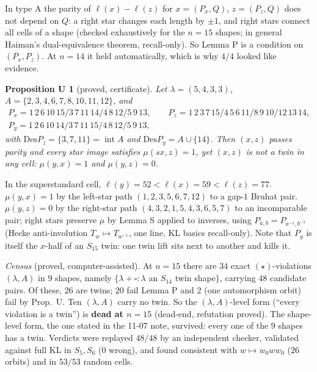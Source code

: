 \documentclass[11pt]{amsart}
\newcommand{\gr}[1]{\textsf{#1}}
\newtheorem*{propU}{Proposition U}
\theoremstyle{definition}
\theoremstyle{remark}
\newcommand{\Des}{\mathrm{Des}}
\newcommand{\intr}{\operatorname{int}}
\begin{document}
In type A the parity of $\ell(x)-\ell(z)$ for $x=(P_x,Q)$, $z=(P_z,Q)$ does not depend on $Q$: a right star changes each length by $\pm1$, and right stars connect all cells of a shape (checked exhaustively for the $n=15$ shapes; in general Haiman's dual-equivalence theorem, recall-only). So Lemma P is a condition on $(P_x,P_z)$. At $n=14$ it held automatically, which is why $4/4$ looked like evidence.

\begin{propU}[\gr{proved}, certificate]
Let $\lambda=(5,4,3,3)$, $A=\{2,3,4,6,7,8,10,11,12\}$, and
\begin{gather*}P_x=1\,2\,6\,10\,15/3\,7\,11\,14/4\,8\,12/5\,9\,13,\qquad P_z=1\,2\,3\,7\,15/4\,5\,6\,11/8\,9\,10/12\,13\,14,\\ P_y=1\,2\,6\,10\,14/3\,7\,11\,15/4\,8\,12/5\,9\,13,\end{gather*}
with $\Des P_z=\{3,7,11\}=\intr A$ and $\Des P_y=A\cup\{14\}$. Then $(x,z)$ passes parity and every star image satisfies $\mu(sx,z)=1$, yet $(x,z)$ is not a twin in any cell: $\mu(y,x)=1$ and $\mu(y,z)=0$.
\end{propU}

In the superstandard cell, $\ell(y)=52<\ell(x)=59<\ell(z)=77$. $\mu(y,x)=1$ by the left-star path $(1,2,3,5,6,7,12)$ to a gap-$1$ Bruhat pair. $\mu(y,z)=0$ by the right-star path $(4,3,2,1,5,4,3,6,5,7)$ to an incomparable pair; right stars preserve $\mu$ by Lemma S applied to inverses, using $P_{a,b}=P_{a^{-1},b^{-1}}$ (Hecke anti-involution $T_w\mapsto T_{w^{-1}}$, one line, KL basics recall-only). Note that $P_y$ is itself the $x$-half of an $S_{15}$ twin: one twin lift sits next to another and kills it.

\emph{Census} (\gr{proved}, computer-assisted). At $n=15$ there are $34$ exact $(\star)$-violations $(\lambda,A)$ in $9$ shapes, namely $\{\lambda+\square:\lambda$ an $S_{14}$ twin shape$\}$, carrying $48$ candidate pairs. Of these, $26$ are twins; $20$ fail Lemma P and $2$ (one automorphism orbit) fail by Prop.~U. Ten $(\lambda,A)$ carry no twin. So the $(\lambda,A)$-level form (``every violation is a twin'') is \textbf{dead at $n=15$} (\gr{dead-end}, refutation \gr{proved}). The shape-level form, the one stated in the 11-07 note, survived: every one of the $9$ shapes has a twin. Verdicts were replayed $48/48$ by an independent checker, validated against full KL in $S_5,S_6$ ($0$ wrong), and found consistent with $w\mapsto w_0ww_0$ ($26$ orbits) and in $53/53$ random cells.

\end{document}
